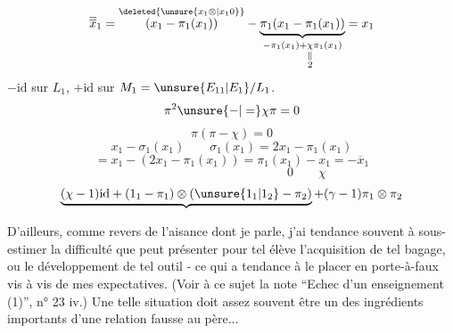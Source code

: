 \[
\overline{\overline{x}}_1
=\overset{\deleted{\unsure{x_1\otimes|x_1 0}}}{(x_1-\pi_1(x_1))}
-\underbrace{\pi_1(x_1-\pi_1(x_1))}_{-\pi_1(x_1)+\underset{\substack{\Vert\\2}}{\chi}\pi_1(x_1)}
=x_1
\]
 \(-\mathrm{id}\) sur \(L_1\), \(+\mathrm{id}\) sur \(M_1=\unsure{E_{11}|E_1}/L_1\).
\[
\pi^2\unsure{-|=}\chi\pi=0
\]
\[
\pi(\pi-\chi)=0
\]
\[
x_1-\sigma_1(x_1)\qquad\sigma_1(x_1)=2x_1-\pi_1(x_1)
\]
\[
=x_1-(2x_1-\pi_1(x_1))=\pi_1(x_1)-x_1=-\overline{x}_1
\]
\[
\hspace{12em}0\qquad\chi
\]
\[
\underbrace{(\chi-1)\mathrm{id}+(1_1-\pi_1)\otimes(\unsure{1_1|1_2}-\pi_2)}
+(\gamma-1)\pi_1\otimes\pi_2
\]

D'ailleurs, comme revers de l'aisance dont je parle, j'ai tendance souvent
à sous-estimer la difficulté que peut présenter pour tel élève l'acquisition de
tel bagage, ou le développement de tel outil - ce qui a tendance à le placer en
porte-à-faux vis à vis de mes expectatives. (Voir à ce sujet la note ``Echec d'un
enseignement (1)'', n° 23 iv.) Une telle situation doit assez souvent être un des
ingrédients importants d'une relation fausse au père...

